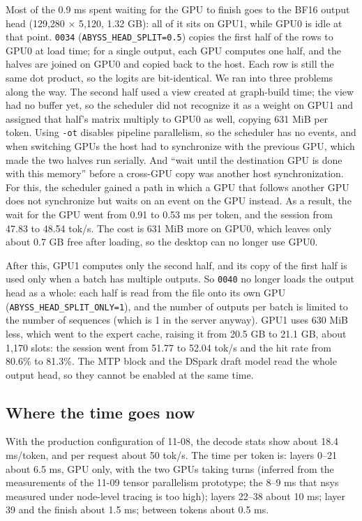 \documentclass[11pt,a4paper]{article}
\newcommand{\code}[1]{\texttt{#1}}
\newcommand{\tps}{tok/s}
\begin{document}
Most of the 0.9 ms spent waiting for the GPU to finish goes to the BF16 output head (129,280 × 5,120, 1.32 GB): all of it sits on GPU1, while GPU0 is idle at that point. \code{0034} (\code{ABYSS\_HEAD\_SPLIT=0.5}) copies the first half of the rows to GPU0 at load time; for a single output, each GPU computes one half, and the halves are joined on GPU0 and copied back to the host. Each row is still the same dot product, so the logits are bit-identical. We ran into three problems along the way. The second half used a view created at graph-build time; the view had no buffer yet, so the scheduler did not recognize it as a weight on GPU1 and assigned that half's matrix multiply to GPU0 as well, copying 631 MiB per token. Using \code{-ot} disables pipeline parallelism, so the scheduler has no events, and when switching GPUs the host had to synchronize with the previous GPU, which made the two halves run serially. And ``wait until the destination GPU is done with this memory'' before a cross-GPU copy was another host synchronization. For this, the scheduler gained a path in which a GPU that follows another GPU does not synchronize but waits on an event on the GPU instead. As a result, the wait for the GPU went from 0.91 to 0.53 ms per token, and the session from 47.83 to 48.54 \tps{}. The cost is 631 MiB more on GPU0, which leaves only about 0.7 GB free after loading, so the desktop can no longer use GPU0.

After this, GPU1 computes only the second half, and its copy of the first half is used only when a batch has multiple outputs. So \code{0040} no longer loads the output head as a whole: each half is read from the file onto its own GPU (\code{ABYSS\_HEAD\_SPLIT\_ONLY=1}), and the number of outputs per batch is limited to the number of sequences (which is 1 in the server anyway). GPU1 uses 630 MiB less, which went to the expert cache, raising it from 20.5 GB to 21.1 GB, about 1,170 slots: the session went from 51.77 to 52.04 \tps{} and the hit rate from 80.6\% to 81.3\%. The MTP block and the DSpark draft model read the whole output head, so they cannot be enabled at the same time.

\subsection{Where the time goes now}
\label{sec:nowtime}

With the production configuration of 11-08, the decode stats show about 18.4 ms/token, and per request about 50 \tps{}. The time per token is: layers 0--21 about 6.5 ms, GPU only, with the two GPUs taking turns (inferred from the measurements of the 11-09 tensor parallelism prototype; the 8--9 ms that nsys measured under node-level tracing is too high); layers 22--38 about 10 ms; layer 39 and the finish about 1.5 ms; between tokens about 0.5 ms.
\end{document}

